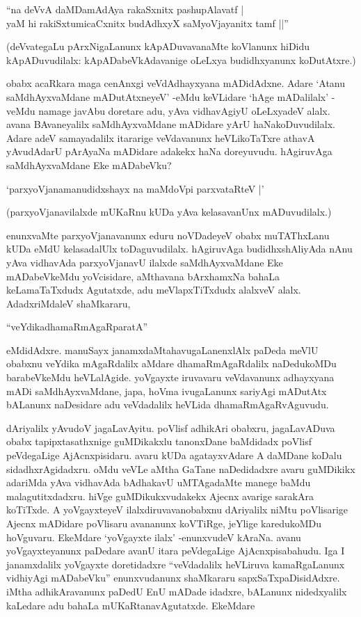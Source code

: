 \begin{shloka}
``na deVvA daMDamAdAya rakaSxnitx pashupAlavatf |\\
yaM hi rakiSxtumicaCxnitx budAdhxyX saMyoVjayanitx tamf ||''
\end{shloka}

(deVvategaLu pArxNigaLanunx kApADuvavanaMte koVlanunx hiDidu kApADuvudilalx: kApADabeVkAdavanige oLeLxya budidhxyanunx koDutAtxre.)


obabx acaRkara maga cenAnxgi veVdAdhayxyana mADidAdxne. Adare `Atanu saMdhAyxvaMdane mADutAtxneyeV' -eMdu keVLidare `hAge mADalilalx' -veMdu namage javAbu doretare adu, yAva vidhavAgiyU oLeLxyadeV alalx. avana BAvaneyalilx saMdhAyxvaMdane mADidare yArU haNakoDuvudilalx. Adare adeV samayadalilx itararige veVdavanunx heVLikoTaTxre athavA yAvudAdarU pArAyaNa mADidare adakekx haNa doreyuvudu. hAgiruvAga saMdhAyxvaMdane Eke mADabeVku?

\begin{shloka}
`parxyoVjanamanudidxshayx na maMdoV\s pi parxvataRteV |'
\end{shloka}

(parxyoVjanavilalxde mUKaRnu kUDa yAva kelasavanUnx mADuvudilalx.)

enunxvaMte parxyoVjanavanunx eduru noVDadeyeV obabx muTAThxLanu kUDa eMdU kelasadalUlx toDaguvudilalx. hAgiruvAga budidhxshAliyAda nAnu yAva vidhavAda parxyoVjanavU ilalxde saMdhAyxvaMdane Eke mADabeVkeMdu yoVcisidare, aMthavana bArxhamxNa bahaLa keLamaTaTxdudx Agutatxde, adu meVlapxTiTxdudx alalxveV alalx. AdadxriMdaleV shaMkararu,

\begin{shloka}
``veYdikadhamaRmAgaRparatA''
\end{shloka}

\noindent eMdidAdxre. manuSayx janamxdaMtahavugaLanenxlAlx paDeda meVlU obabxnu veYdika mAgaRdalilx aMdare dhamaRmAgaRdalilx naDedukoMDu barabeVkeMdu heVLalAgide. yoVgayxte iruvavaru veVdavanunx adhayxyana mADi saMdhAyxvaMdane, japa, hoVma ivugaLanunx sariyAgi mADutAtx bALanunx naDesidare adu veVdadalilx heVLida dhamaRmAgaRvAguvudu.

dAriyalilx yAvudoV jagaLavAyitu. poVlisf adhikAri obabxru, jagaLavADuva obabx tapipxtasathxnige guMDikakxlu tanonxDane baMdidadx poVlisf peVdegaLige AjAcnxpisidaru. avaru kUDa agatayxvAdare A daMDane koDalu sidadhxrAgidadxru. oMdu veVLe aMtha GaTane naDedidadxre avaru guMDikikx adariMda yAva vidhavAda bAdhakavU uMTAgadaMte manege baMdu malagutitxdadxru. hiVge guMDikukxvudakekx Ajecnx avarige sarakAra koTiTxde. A yoVgayxteyeV ilalxdiruvavanobabxnu dAriyalilx niMtu poVlisarige Ajecnx mADidare poVlisaru avananunx koVTiRge, jeYlige karedukoMDu hoVguvaru. EkeMdare `yoVgayxte ilalx' -enunxvudeV kAraNa. avanu yoVgayxteyanunx paDedare avanU itara peVdegaLige AjAcnxpisabahudu. Iga I janamxdalilx yoVgayxte doretidadxre ``veVdadalilx heVLiruva kamaRgaLanunx vidhiyAgi mADabeVku'' enunxvudanunx shaMkararu sapxSaTxpaDisidAdxre. iMtha adhikAravanunx paDedU EnU mADade idadxre, bALanunx nidedxyalilx kaLedare adu bahaLa mUKaRtanavAgutatxde. EkeMdare

